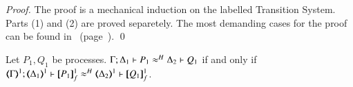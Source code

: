 \begin{comment}
			\item 
		    If $\ell_2 = \tau$ 
			then $\Delta' = \Delta$ and 
			either
			\begin{enumerate}[(i)]
			\item $\exists P'$ s.t. 
			$\stytra{ \Gamma }{\tau}{ \Delta }{ P}{ \Delta}{ P'}$, and $Q = \map{P'}^{1}_f$.	

			\item $\exists P_1, P_2, x, m, Q'$ s.t. 
			$\stytra{ \Gamma }{\tau}{ \Delta }{ P}{ \Delta}{\news{\tilde{m}}( P_1 \Par P_2\subst{m}{x}) }$, and 
			$Q = \map{P_1}^{1}_f \Par Q'$, where $Q'  \Hby{} \map{P_2\subst{m}{x}}^{1}_f$.

			\item $\exists P_1, P_2, x, R$ s.t. 
			$\stytra{ \Gamma }{\tau}{ \Delta }{ P}{ \Delta}{ \news{\tilde{m}}(P_1 \Par P_2\subst{\abs{y}R}{x}) }$, and 
			$Q = \map{\news{\tilde{m}}(P_1 \Par P_2\subst{\abs{y}R}{x})}^{1}_f$.

			\end{enumerate}
		    \end{enumerate}
		    
	\end{enumerate}
\end{proposition}
\end{comment}

\begin{proof}
	The proof is a mechanical induction on the labelled Transition System.
	Parts (1) and (2) are proved separetely.
	The most demanding cases for the proof can be found in~
	(page~\pageref{app:prop:op_corr_HOp_to_HO}).
	\qed
\end{proof}

\begin{proposition}\myrm
	\label{prop:fulla_HOp_to_HO}
	Let $P_1, Q_1$ be \HOp processes.
	$\Gamma; \Delta_1 \vdash P_1 \approx^{H} \Delta_2 \vdash Q_1$
	if and only if
	$\horel{\tmap{\Gamma}{1}}{\tmap{\Delta_1}{1}}{\pmapp{P_1}{1}{f}}{\hwb}{\tmap{\Delta_2}{1}}{\pmapp{Q_1}{1}{f}}$.
\end{proposition}

